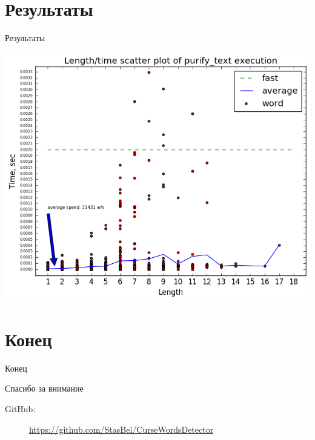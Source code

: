 \documentclass{beamer}
\begin{document}
\section{Результаты}
\begin{frame}[t]{Результаты}
    \begin{center}
        \includegraphics[width=0.74\linewidth]{length_time_plot.png}
    \end{center}
\end{frame}

\section{Конец}
\begin{frame}[t]{Конец}
    \begin{center}
    Спасибо за внимание
    \end{center}
	\begin{description}
		\item[GitHub:]  \url{https://github.com/StasBel/CurseWordsDetector}
	\end{description}
\end{frame}
\end{document}
